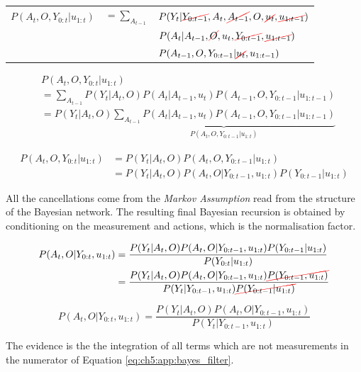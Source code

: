 \begin{tabular}{lll}
   $P(A_t,O,Y_{0:t}|u_{1:t})$ & $=\sum_{A_{t-1}}$ &  $P(Y_t|\Ccancel[red]{Y_{0:t-1}},A_t,\cancel{A_{t-1}},O,\cancel{u_{t}},\cancel{u_{1:t-1}}) $ \\
			      &  & $P(A_t|A_{t-1},\Ccancel[red]{O},u_{t},\Ccancel[red]{Y_{0:t-1}},\Ccancel[red]{u_{1:t-1}}) $ \\
			      &  & $P( A_{t-1},O,Y_{0:t-1}|\Ccancel[red]{u_t},u_{1:t-1})$
\end{tabular}

\begin{align}
  &P(A_t,O,Y_{0:t}|u_{1:t}) \\
  &= \sum_{A_{t-1}} P(Y_t|A_{t},O)  P(A_t|A_{t-1},u_{t})  P(A_{t-1},O,Y_{0:t-1}|u_{1:t-1}) \nonumber \\
  &= P(Y_t|A_{t},O)  \underbrace{\sum_{A_{t-1}} P(A_t|A_{t-1},u_t)  P(A_{t-1},O,Y_{0:t-1}|u_{1:t-1})}_{P(A_t,O,Y_{0:t-1}|u_{1:t})} 
\end{align}

\begin{align}
   P(A_t,O,Y_{0:t}|u_{1:t}) &= P(Y_t|A_{t},O)  P(A_t,O,Y_{0:t-1}|u_{1:t}) \nonumber \\
			    &= P(Y_t|A_{t},O)  P(A_t,O|Y_{0:t-1},u_{1:t})  P(Y_{0:t-1}|u_{1:t})
\end{align}

All the cancellations come from the \textit{Markov Assumption} read from the structure of the Bayesian network.
The resulting final Bayesian recursion is obtained by conditioning on the measurement and actions, which is the normalisation factor.

\begin{align}\label{eq:ch5_measurement_update}
 P(A_t,O|Y_{0:t},u_{1:t}) &= \frac{P(Y_t|A_{t},O)  P(A_t,O|Y_{0:t-1},u_{1:t})  P(Y_{0:t-1}|u_{1:t})}{P(Y_{0:t}|u_{1:t})} \nonumber \\
			  &= \frac{P(Y_t|A_{t},O)  P(A_t,O|Y_{0:t-1},u_{1:t})  \Ccancel[red]{P(Y_{0:t-1},u_{1:t})}}{P(Y_t|Y_{0:t-1},u_{1:t}) \Ccancel[red]{P(Y_{0:t-1}|u_{1:t})}}   
\end{align}
 
\begin{equation}
   P(A_t,O|Y_{0:t},u_{1:t}) = \frac{P(Y_t|A_{t},O) P(A_{t},O|Y_{0:t-1},u_{1:t})}{P(Y_t|Y_{0:t-1},u_{1:t})} \label{eq:ch5:app:bayes_filter}
\end{equation}

The evidence is the the integration of all terms which are not measurements in the numerator of Equation \ref{eq:ch5:app:bayes_filter}.

